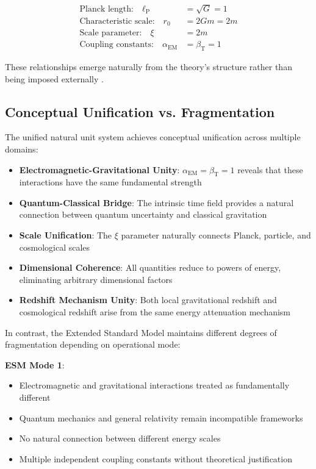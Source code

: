 \documentclass[12pt,a4paper]{article}
\newcommand{\alphaEM}{\alpha_{\text{EM}}}
\newcommand{\betaT}{\beta_{\text{T}}}
\newcommand{\lP}{\ell_{\text{P}}}
\newcommand{\xipar}{\xi}
\begin{document}
	\begin{align}
		\text{Planck length:} \quad \lP &= \sqrt{G} = 1 \nonumber\\
		\text{Characteristic scale:} \quad r_0 &= 2Gm = 2m \nonumber\\
		\text{Scale parameter:} \quad \xipar &= 2m \nonumber\\
		\text{Coupling constants:} \quad \alphaEM &= \betaT = 1 \nonumber
	\end{align}
	
	These relationships emerge naturally from the theory's structure rather than being imposed externally \cite{pascher_beta_derivation_2025}.
	
	\subsection{Conceptual Unification vs. Fragmentation}
	\label{subsec:unification_fragmentation}
	
	The unified natural unit system achieves conceptual unification across multiple domains:
	
	\begin{itemize}
		\item \textbf{Electromagnetic-Gravitational Unity}: $\alphaEM = \betaT = 1$ reveals that these interactions have the same fundamental strength
		\item \textbf{Quantum-Classical Bridge}: The intrinsic time field provides a natural connection between quantum uncertainty and classical gravitation
		\item \textbf{Scale Unification}: The $\xipar$ parameter naturally connects Planck, particle, and cosmological scales
		\item \textbf{Dimensional Coherence}: All quantities reduce to powers of energy, eliminating arbitrary dimensional factors
		\item \textbf{Redshift Mechanism Unity}: Both local gravitational redshift and cosmological redshift arise from the same energy attenuation mechanism \cite{Pound1960}
	\end{itemize}
	
	In contrast, the Extended Standard Model maintains different degrees of fragmentation depending on operational mode:
	
	\textbf{ESM Mode 1}:
	\begin{itemize}
		\item Electromagnetic and gravitational interactions treated as fundamentally different
		\item Quantum mechanics and general relativity remain incompatible frameworks
		\item No natural connection between different energy scales
		\item Multiple independent coupling constants without theoretical justification
	\end{itemize}
	
\end{document}

